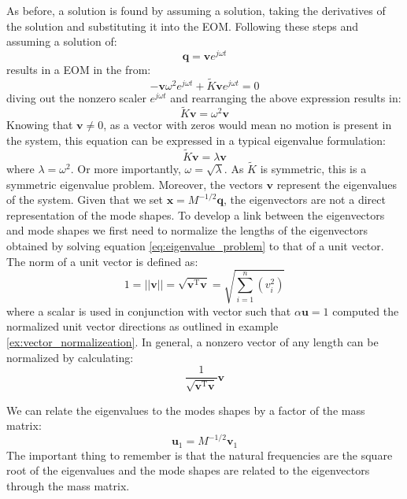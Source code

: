 \documentclass[12pt,letter]{article}
\numberwithin{ex}{section} %
\numberwithin{re}{section} %
\begin{document}
As before, a solution is found by assuming a solution, taking the derivatives of the solution and substituting it into the EOM. Following these steps and assuming a solution of:
\begin{equation}
\mathbf{q} = \textbf{v}e^{j\omega t}
\end{equation}
results in a EOM in the from:
\begin{equation}
-\textbf{v} \omega^2 e^{j\omega t} + \widetilde{K}\textbf{v}e^{j\omega t} =0
\end{equation}
diving out the nonzero scaler $e^{j\omega t}$ and rearranging the above expression results in:
\begin{equation}
\widetilde{K}\textbf{v} =  \omega^2 \textbf{v}
\end{equation}
Knowing that $\textbf{v}\neq0$, as a vector with zeros would mean no motion is present in the system, this equation can be expressed in a typical eigenvalue formulation:
\begin{equation}
\widetilde{K}\textbf{v} =  \lambda \textbf{v}
\label{eq:eigenvalue_problem}
\end{equation}
where $\lambda = \omega^2 $. Or more importantly, $\omega = \sqrt{\lambda}$. As $\widetilde{K}$ is symmetric, this is a symmetric eigenvalue problem. Moreover, the vectors $\textbf{v}$ represent the eigenvalues of the system. Given that  we set $\mathbf{x}=M^{-1/2}\mathbf{q}$, the eigenvectors are not a direct representation of the mode shapes. To develop a link between the eigenvectors and mode shapes we first need to normalize the lengths of the eigenvectors obtained by solving equation \ref{eq:eigenvalue_problem} to that of a unit vector. The norm of a unit vector is defined as:
\begin{equation}
1= ||\textbf{v}|| = \sqrt{\textbf{v}^{\text{T}}\textbf{v}} = \sqrt{\sum_{i=1}^{n}(v_i^2)}
\end{equation} 
where a scalar is used in conjunction with vector such that $\alpha\textbf{u}=1$ computed the normalized unit vector directions as outlined in example \ref{ex:vector_normalizeation}. In general, a nonzero vector of any length can be normalized by calculating:
\begin{equation}
\frac{1}{\sqrt{\textbf{v}^{\text{T}}\textbf{v}} } \textbf{v}
\end{equation} 


We can relate the eigenvalues to the modes shapes by a factor of the mass matrix:
\begin{equation}
\textbf{u}_1 = M^{-1/2}\textbf{v}_1
\end{equation}
The important thing to remember is that the natural frequencies are the square root of the eigenvalues and the mode shapes are related to the eigenvectors through the mass matrix. 
\end{document}
